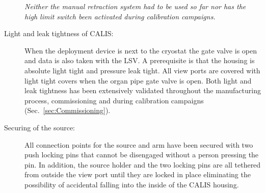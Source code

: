 \begin{description}
\textit{Neither the manual retraction system had to be used so far nor has the high limit switch been activated during calibration campaigns.}
    
\item[Light and leak tightness of CALIS:]
When the deployment device is next to the cryostat the gate valve is open and data is also taken with the LSV. A prerequisite is that the housing is absolute light tight and pressure leak tight. All view ports are covered with light tight covers when the organ pipe gate valve is open. Both light and leak tightness has been extensively validated throughout the manufacturing process, commissioning and during calibration campaigns (Sec.~\ref{sec:Commissioning}).

\item[Securing of the source:] 
All connection points for the source and arm have been secured with two push locking pins that cannot be disengaged without a person pressing the pin. In addition, the source holder and the two locking pins are all tethered from outside the view port until they are locked in place eliminating the possibility of accidental falling into the inside of the CALIS housing.

\end{description}
	

